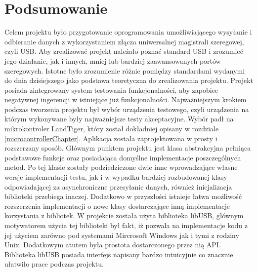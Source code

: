 \documentclass{BscUS}
\begin{document}
\chapter{Podsumowanie}
\label{ConclusionChapter}
\indent Celem projektu było przygotowanie oprogramowania umożliwiającego wysyłanie i odbieranie danych z wykorzystaniem złącza uniwersalnej magistrali szeregowej, czyli USB. Aby zrealizować projekt należało poznać standard USB i zrozumieć jego działanie, jak i innych, mniej lub bardziej zaawansowanych portów szeregowych. Istotne było zrozumienie różnic pomiędzy standardami wydanymi do dnia dzisiejszego jako podstawa teoretyczna do zrealizowania projektu. Projekt posiada zintegrowany system testowania funkcjonalności, aby zapobiec negatywnej ingerencji w istniejące już funkcjonalności.
\newline
\indent Najważniejszym krokiem podczas tworzenia projektu był wybór urządzenia testowego, czyli urządzenia na którym wykonywane były najważniejsze testy akceptacyjne. Wybór padł na mikrokontroler LandTiger, który został dokładniej opisany w rozdziale \ref{microcontrollerChapter}. Aplikacja została zaprojektowana w prosty i rozszerzany sposób. Głównym punktem projektu jest klasa abstrakcyjna pełniąca podstawowe funkcje oraz posiadająca domyślne implementacje poszczególnych metod. Po tej klasie zostały podziedziczone dwie inne wprowadzające własne wersje implementacji testu, jak i w wypadku bardziej rozbudowanej klasy odpowiadającej za asynchroniczne przesyłanie danych, również inicjalizacja biblioteki przebiega inaczej. Dodatkowo w przyszłości istnieje łatwa możliwość rozszerzenia implementacji o nowe klasy dostarczające inną implementacje korzystania z bibliotek.
\newline
\indent W projekcie została użyta biblioteka libUSB, głównym motywatorem użycia tej biblioteki był fakt, iż pozwala na implementacje kodu z jej użyciem zarówno pod systemami Mircrosoft Windows jak i tymi z rodziny Unix. Dodatkowym atutem była prostota dostarczonego przez nią API. Biblioteka libUSB posiada interfejs napisany bardzo intuicyjnie co znacznie ułatwiło prace podczas projektu.
\newline
\end{document}
